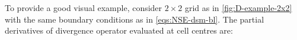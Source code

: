 \documentclass{article}
\numberwithin{equation}{section}
\begin{document}
To provide a good visual example, consider $2 \times 2$ grid as in \cref{fig:D-example-2x2} with the same boundary conditions as in \cref{eqs:NSE-dsm-bl}. The partial derivatives of divergence operator evaluated at cell centres are: 
%
%
\end{document}
